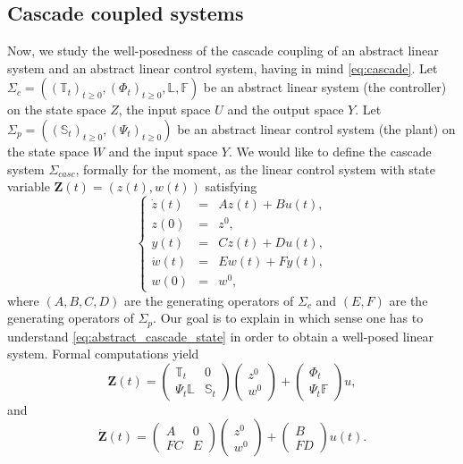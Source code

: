 \documentclass[10pt]{article}
\begin{document}
\subsection{Cascade coupled systems}\label{sec:WP}
Now, we study the well-posedness of the cascade coupling of an abstract linear system and an abstract linear control system, having in mind \eqref{eq:cascade}. Let $\Sigma_c = ((\mathbb{T}_t)_{t \geq 0},(\Phi_t)_{t \geq 0},\mathbb{L}, \mathbb{F})$ be an abstract linear system (the controller) on the state space $Z$, the input space $U$ and the output space $Y$. Let $\Sigma_p = ((\mathbb{S}_t)_{t \geq 0},(\Psi_t)_{t \geq 0})$ be an abstract linear control system (the plant) on the state space $W$ and the input space $Y$. We would like to define the cascade system $\Sigma_{casc}$, formally for the moment, as the linear control system with state variable $\mathbf{Z}(t) = (z(t),w(t))$ satisfying
\begin{equation}\label{eq:abstract_cascade_state}
    \left\lbrace \begin{array}{rcl}
\dot{z}(t) &=& Az(t) + Bu(t), \\
z(0) &=& z^0, \\
y(t) &=& Cz(t) + Du(t), \\
\dot{w}(t) &=& Ew(t) + Fy(t), \\
w(0) &=& w^0,
\end{array}\right.
\end{equation}
where $(A,B,C,D)$ are the generating operators of $\Sigma_c$ and $(E,F)$ are the generating operators of $\Sigma_p$. Our goal is to explain in which sense one has to understand \eqref{eq:abstract_cascade_state} in order to obtain a well-posed linear system. Formal computations yield 
\begin{equation}\label{eq:def_abstract_cascade_operator}
    \mathbf{Z}(t) = \left( \begin{array}{cc}
\mathbb{T}_t & 0 \\
\Psi_t \mathbb{L} & \mathbb{S}_t
\end{array} \right) \left( \begin{array}{c}
z^0 \\
w^0
\end{array} \right) + \left( \begin{array}{c}
\Phi_t\\
\Psi_t \mathbb{F}
\end{array} \right)u,
\end{equation}
and 
\begin{equation}\label{eq:formal_generator_casc}
    \dot{\mathbf{Z}}(t) = \left( \begin{array}{cc}
A & 0 \\
FC & E
\end{array} \right)\left( \begin{array}{c}
z^0 \\
w^0
\end{array} \right) + \left( \begin{array}{c}
B \\
FD
\end{array} \right)u(t). 
\end{equation}
\end{document}

